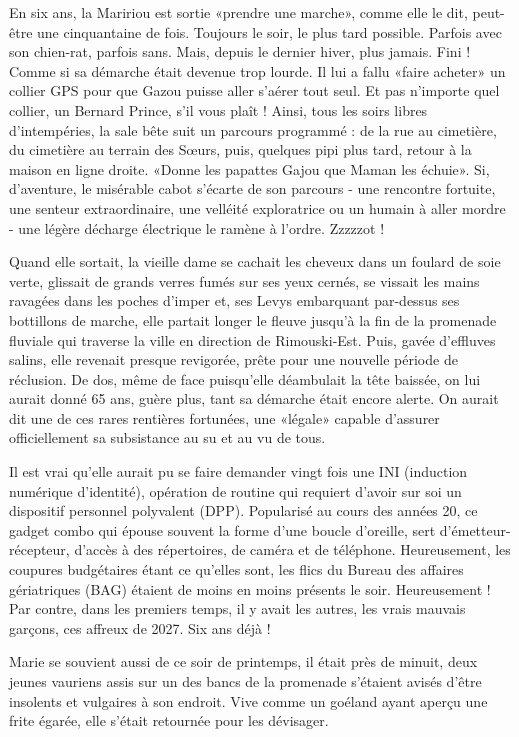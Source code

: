 En six ans, la Maririou est sortie «prendre une marche», comme elle le dit, peut-être une cinquantaine de fois. Toujours le soir, le plus tard possible. Parfois avec son chien-rat, parfois sans. Mais, depuis le dernier hiver, plus jamais. Fini ! Comme si sa démarche était devenue trop lourde. Il lui a fallu «faire acheter» un collier GPS pour que Gazou puisse aller s’aérer tout seul. Et pas n’importe quel collier, un Bernard Prince, s’il vous plaît ! Ainsi, tous les soirs libres d’intempéries, la sale bête suit un parcours programmé : de la rue au cimetière, du cimetière au terrain des Sœurs, puis, quelques pipi plus tard, retour à la maison en ligne droite. «Donne les papattes Gajou que Maman les échuie». Si, d’aventure, le misérable cabot s’écarte de son parcours - une rencontre fortuite, une senteur extraordinaire, une velléité exploratrice ou un humain à aller mordre - une légère décharge électrique le ramène à l’ordre. Zzzzzot !

Quand elle sortait, la vieille dame se cachait les cheveux dans un foulard de soie verte, glissait de grands verres fumés sur ses yeux cernés, se vissait les mains ravagées dans les poches d’imper et, ses Levys embarquant par-dessus ses bottillons de marche, elle partait longer le fleuve jusqu’à la fin de la promenade fluviale qui traverse la ville en direction de Rimouski-Est. Puis, gavée d’effluves salins, elle revenait presque revigorée, prête pour une nouvelle période de réclusion. De dos, même de face puisqu’elle déambulait la tête baissée, on lui aurait donné 65 ans, guère plus, tant sa démarche était encore alerte. On aurait dit une de ces rares rentières fortunées, une «légale» capable d’assurer officiellement sa subsistance au su et au vu de tous.

Il est vrai qu’elle aurait pu se faire demander vingt fois une INI (induction numérique d’identité), opération de routine qui requiert d’avoir sur soi un dispositif personnel polyvalent (DPP). Popularisé au cours des années 20, ce gadget combo qui épouse souvent la forme d’une boucle d’oreille, sert d’émetteur- récepteur, d’accès à des répertoires, de caméra et de téléphone. Heureusement, les coupures budgétaires étant ce qu’elles sont, les flics du Bureau des affaires gériatriques (BAG) étaient de moins en moins présents le soir. Heureusement ! Par contre, dans les premiers temps, il y avait les autres, les vrais mauvais garçons, ces affreux de 2027. Six ans déjà !

Marie se souvient aussi de ce soir de printemps, il était près de minuit, deux jeunes vauriens assis sur un des bancs de la promenade s’étaient avisés d’être insolents et vulgaires à son endroit. Vive comme un goéland ayant aperçu une frite égarée, elle s’était retournée pour les dévisager.

